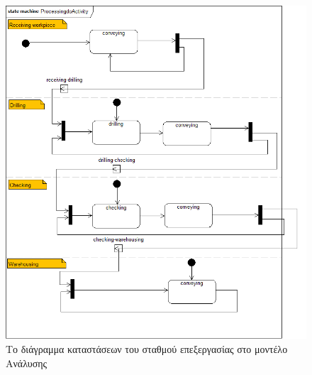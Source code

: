 \documentclass[a4paper,12pt,twoside]{report}
\begin{document}
\begin{appendices}
			\begin{figure}[hp]
					\centering
					\includegraphics[scale=0.30]{AnalysisModel_stm-ProcessingStation(Processingstate).png}
					\caption{Το διάγραμμα καταστάσεων του σταθμού επεξεργασίας στο μοντέλο Ανάλυσης}
					\label{φωτ:Το διάγραμμα καταστάσεων του σταθμού επεξεργασίας στο μοντέλο Ανάλυσης}
			\end{figure}
			

\end{appendices}
\end{document}
